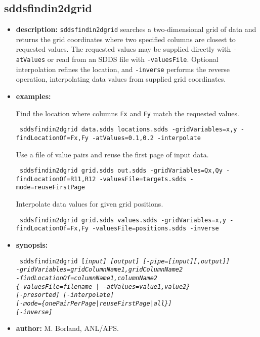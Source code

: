 \newpage
\subsection{sddsfindin2dgrid}
\label{sddsfindin2dgrid}

\begin{itemize}
\item {\bf description:} \verb|sddsfindin2dgrid| searches a two-dimensional grid of data and returns the grid coordinates where two specified columns are closest to requested values. The requested values may be supplied directly with \verb|-atValues| or read from an SDDS file with \verb|-valuesFile|. Optional interpolation refines the location, and \verb|-inverse| performs the reverse operation, interpolating data values from supplied grid coordinates.
\item {\bf examples:}

Find the location where columns \verb|Fx| and \verb|Fy| match the requested values.
\begin{flushleft}{\tt
sddsfindin2dgrid data.sdds locations.sdds -gridVariables=x,y -findLocationOf=Fx,Fy -atValues=0.1,0.2 -interpolate
}\end{flushleft}

Use a file of value pairs and reuse the first page of input data.
\begin{flushleft}{\tt
sddsfindin2dgrid grid.sdds out.sdds -gridVariables=Qx,Qy -findLocationOf=R11,R12 -valuesFile=targets.sdds -mode=reuseFirstPage
}\end{flushleft}

Interpolate data values for given grid positions.
\begin{flushleft}{\tt
sddsfindin2dgrid grid.sdds values.sdds -gridVariables=x,y -findLocationOf=Fx,Fy -valuesFile=positions.sdds -inverse
}\end{flushleft}

\item {\bf synopsis:}
\begin{flushleft}{\tt
sddsfindin2dgrid [\em input] [\em output] [-pipe=[input][,output]] \\
  -gridVariables=\em gridColumnName1,gridColumnName2 \\
  -findLocationOf=\em columnName1,columnName2 \\
  \{-valuesFile=\em filename\ |\ -atValues=\em value1,value2\} \\
   {}[-presorted] [-interpolate] \\
   {}[-mode=\{onePairPerPage|reuseFirstPage|all\}] \\
   {}[-inverse]
}\end{flushleft}

\item {\bf author:} M. Borland, ANL/APS.
\end{itemize}
